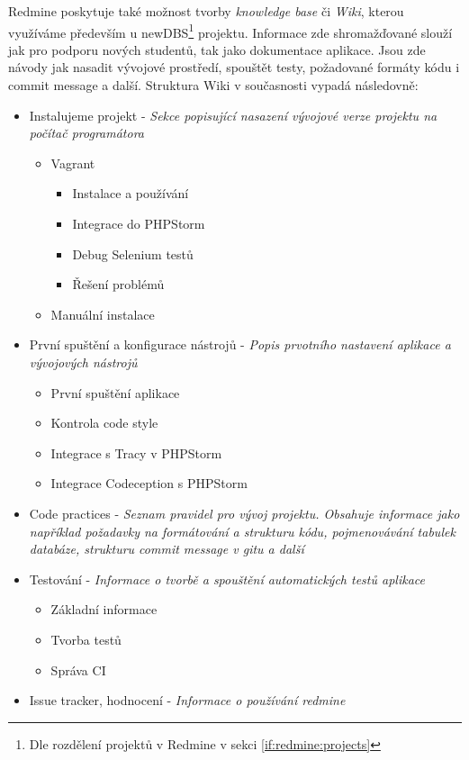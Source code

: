 Redmine poskytuje také možnost tvorby \emph{knowledge base} či \emph{Wiki}, kterou využíváme především u newDBS\footnote{Dle rozdělení projektů v Redmine v sekci \ref{if:redmine:projects}} projektu. Informace zde shromažďované slouží jak pro podporu nových studentů, tak jako dokumentace aplikace. Jsou zde návody jak nasadit vývojové prostředí, spouštět testy, požadované formáty kódu i commit message a další. Struktura Wiki v současnosti vypadá následovně:
\begin{itemize}
	\item Instalujeme projekt - \emph{Sekce popisující nasazení vývojové verze projektu na počítač programátora}
	\begin{itemize}
		\item Vagrant
		\begin{itemize}
			\item Instalace a používání
			\item Integrace do PHPStorm
			\item Debug Selenium testů
			\item Řešení problémů
		\end{itemize}
		\item Manuální instalace
	\end{itemize}
	\item První spuštění a konfigurace nástrojů - \emph{Popis prvotního nastavení aplikace a vývojových nástrojů}
	\begin{itemize}
		\item První spuštění aplikace
		\item Kontrola code style
		\item Integrace s Tracy v PHPStorm
		\item Integrace Codeception s PHPStorm
	\end{itemize}
	\item Code practices - \emph{Seznam pravidel pro vývoj projektu. Obsahuje informace jako například požadavky na formátování a strukturu kódu, pojmenovávání tabulek databáze, strukturu commit message v gitu a další}
	\item Testování - \emph{Informace o tvorbě a spouštění automatických testů aplikace}
	\begin{itemize}
		\item Základní informace
		\item Tvorba testů
		\item Správa CI
	\end{itemize}
	\item Issue tracker, hodnocení - \emph{Informace o používání redmine}

\end{itemize}
